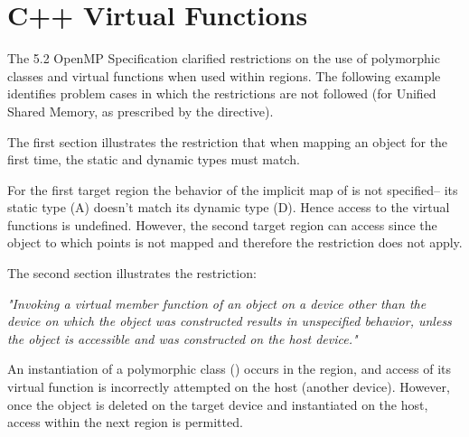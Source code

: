 \pagebreak
\section{C++ Virtual Functions}
\label{sec:virtual_functions}


The 5.2 OpenMP Specification clarified restrictions on the use 
of polymorphic classes and virtual functions when used within 
 regions.  The following example identifies 
problem cases in which the restrictions are not followed
(for Unified Shared Memory, as prescribed by the 
directive).

The first section illustrates the restriction
that when mapping an object for the first time, 
the static and dynamic types must match.

For the first target region the behavior of the implicit map of  
is not specified-- its static type (A) doesn't match its dynamic type (D).  
Hence access to the virtual functions is undefined.
However, the second target region can access  
since the object to which  points is not mapped and 
therefore the restriction does not apply.

The second section illustrates the restriction:

\emph{"Invoking a virtual member function of an object on a device other than the device on which the
object was constructed results in unspecified behavior, unless the object is accessible and was
constructed on the host device."}

An instantiation of a polymorphic class () occurs in the 
 region, and access of its virtual function
is incorrectly attempted on the host (another device).
However, once the object is deleted on
the target device and instantiated on the host, access within
the next  region is permitted.

